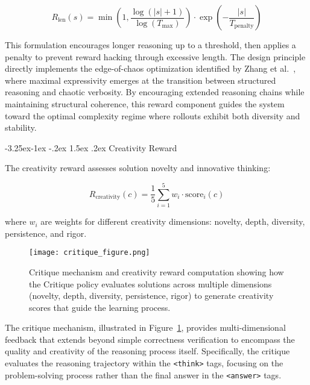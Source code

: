 \documentclass[10pt,a4paper]{article}
\makeatletter
\renewcommand\subsubsection{\@startsection{subsubsection}{3}{\z@}%
  {-3.25ex\@plus -1ex \@minus -.2ex}%
  {1.5ex \@plus .2ex}%
  {\fontfamily{sourcecodepro}\selectfont\normalsize\bfseries}}
\makeatother
\begin{document}
\begin{equation}
R_{\text{len}}(s) = \min\left(1, \frac{\log(|s| + 1)}{\log(T_{\text{max}})}\right) \cdot \exp\left(-\frac{|s|}{T_{\text{penalty}}}\right)
\end{equation}

This formulation encourages longer reasoning up to a threshold, then applies a penalty to prevent reward hacking through excessive length. The design principle directly implements the edge-of-chaos optimization identified by Zhang et al.~\cite{zhang2024intelligence}, where maximal expressivity emerges at the transition between structured reasoning and chaotic verbosity. By encouraging extended reasoning chains while maintaining structural coherence, this reward component guides the system toward the optimal complexity regime where rollouts exhibit both diversity and stability.

\subsubsection{Creativity Reward}

The creativity reward assesses solution novelty and innovative thinking:

\begin{equation}
R_{\text{creativity}}(c) = \frac{1}{5} \sum_{i=1}^{5} w_i \cdot \text{score}_i(c)
\end{equation}

where $w_i$ are weights for different creativity dimensions: novelty, depth, diversity, persistence, and rigor.

\begin{figure}[htbp]
\centering
\texttt{[image: critique\_figure.png]}
\caption{Critique mechanism and creativity reward computation showing how the Critique policy evaluates solutions across multiple dimensions (novelty, depth, diversity, persistence, rigor) to generate creativity scores that guide the learning process.}
\label{fig:critique}
\end{figure}

The critique mechanism, illustrated in Figure~\ref{fig:critique}, provides multi-dimensional feedback that extends beyond simple correctness verification to encompass the quality and creativity of the reasoning process itself. Specifically, the critique evaluates the reasoning trajectory within the \texttt{<think>} tags, focusing on the problem-solving process rather than the final answer in the \texttt{<answer>} tags.
\end{document}
